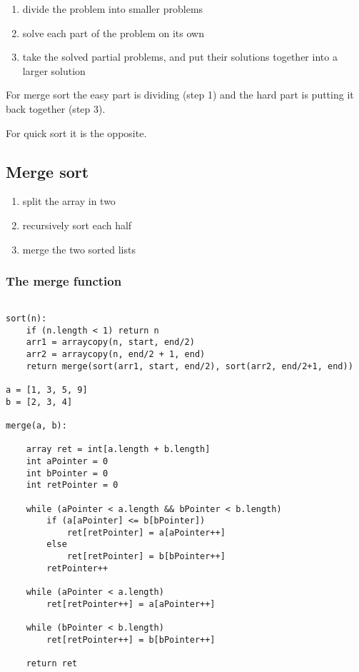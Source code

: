 \documentclass{article}
\begin{document}
\begin{enumerate}
    \item divide the problem into smaller problems
    \item solve each part of the problem on its own
    \item take the solved partial problems, and put their solutions together into a larger solution
\end{enumerate}

For merge sort the easy part is dividing (step 1) and the hard part is putting it back together (step 3).

For quick sort it is the opposite.

\subsection{Merge sort}

\begin{enumerate}
    \item split the array in two
    \item recursively sort each half
    \item merge the two sorted lists
\end{enumerate}

\subsubsection{The merge function}

\begin{verbatim}

sort(n):
    if (n.length < 1) return n 
    arr1 = arraycopy(n, start, end/2)
    arr2 = arraycopy(n, end/2 + 1, end)
    return merge(sort(arr1, start, end/2), sort(arr2, end/2+1, end))

a = [1, 3, 5, 9]
b = [2, 3, 4]

merge(a, b):

    array ret = int[a.length + b.length]
    int aPointer = 0
    int bPointer = 0
    int retPointer = 0

    while (aPointer < a.length && bPointer < b.length)
        if (a[aPointer] <= b[bPointer])
            ret[retPointer] = a[aPointer++]
        else
            ret[retPointer] = b[bPointer++]
        retPointer++
    
    while (aPointer < a.length)
        ret[retPointer++] = a[aPointer++]
            
    while (bPointer < b.length)
        ret[retPointer++] = b[bPointer++]

    return ret

\end{verbatim}
\end{document}
